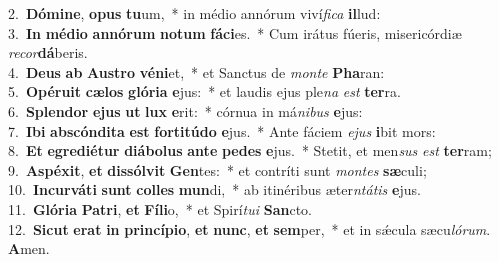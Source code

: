 {2.~}\textbf{Dó}\textbf{mi}\textbf{ne}, \textbf{o}\textbf{pus} \textbf{tu}um,~* in médio annórum viví\textit{fi}\textit{ca} \textbf{il}lud:\\
{3.~}\textbf{In} \textbf{mé}\textbf{di}\textbf{o} \textbf{an}\textbf{nó}\textbf{rum} \textbf{no}\textbf{tum} \textbf{fá}\textbf{ci}es.~* Cum irátus fúeris, misericórdiæ \textit{re}\textit{cor}\textbf{dá}beris.\\
{4.~}\textbf{De}\textbf{us} \textbf{ab} \textbf{Au}\textbf{stro} \textbf{vé}\textbf{ni}et,~* et Sanctus de \textit{mon}\textit{te} \textbf{Pha}ran:\\
{5.~}\textbf{O}\textbf{pé}\textbf{ru}\textbf{it} \textbf{cæ}\textbf{los} \textbf{gló}\textbf{ri}\textbf{a} \textbf{e}jus:~* et laudis ejus ple\textit{na} \textit{est} \textbf{ter}ra.\\
{6.~}\textbf{Splen}\textbf{dor} \textbf{e}\textbf{jus} \textbf{ut} \textbf{lux} \textbf{e}rit:~* córnua in má\textit{ni}\textit{bus} \textbf{e}jus:\\
{7.~}\textbf{I}\textbf{bi} \textbf{ab}\textbf{scón}\textbf{di}\textbf{ta} \textbf{est} \textbf{for}\textbf{ti}\textbf{tú}\textbf{do} \textbf{e}jus.~* Ante fáciem \textit{e}\textit{jus} \textbf{i}bit mors:\\
{8.~}\textbf{Et} \textbf{e}\textbf{gre}\textbf{di}\textbf{é}\textbf{tur} \textbf{di}\textbf{á}\textbf{bo}\textbf{lus} \textbf{an}\textbf{te} \textbf{pe}\textbf{des} \textbf{e}jus.~* Stetit, et men\textit{sus} \textit{est} \textbf{ter}ram;\\
{9.~}\textbf{A}\textbf{spé}\textbf{xit}, \textbf{et} \textbf{dis}\textbf{sól}\textbf{vit} \textbf{Gen}tes:~* et contríti sunt \textit{mon}\textit{tes} \textbf{sæ}culi;\\
{10.~}\textbf{In}\textbf{cur}\textbf{vá}\textbf{ti} \textbf{sunt} \textbf{col}\textbf{les} \textbf{mun}di,~* ab itinéribus æter\textit{ntá}\textit{tis} \textbf{e}jus.\\
{11.~}\textbf{Gló}\textbf{ri}\textbf{a} \textbf{Pa}\textbf{tri}, \textbf{et} \textbf{Fí}\textbf{li}o,~* et Spirí\textit{tu}\textit{i} \textbf{San}cto.\\
{12.~}\textbf{Si}\textbf{cut} \textbf{e}\textbf{rat} \textbf{in} \textbf{prin}\textbf{cí}\textbf{pi}\textbf{o}, \textbf{et} \textbf{nunc}, \textbf{et} \textbf{sem}per,~* et in sǽcula sæcu\textit{ló}\textit{rum}. \textbf{A}men.\\
